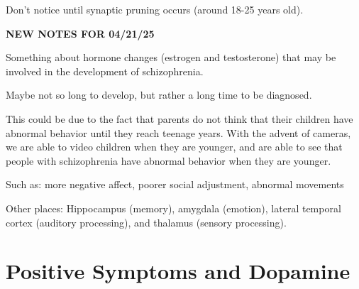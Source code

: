 \begin{coloredlist}
\begin{coloredlist}
\begin{coloredlist}
            \item Don't notice until synaptic pruning occurs (around 18-25 years old).
            \begin{center}
                \textbf{NEW NOTES FOR 04/21/25} \\
                \hrulefill
            \end{center}
            \item Something about hormone changes (estrogen and testosterone) that may be involved in the development of schizophrenia.
            \item Maybe not so long to develop, but rather a long time to be diagnosed.
            \begin{coloredlist}
                \item This could be due to the fact that parents do not think that their children have abnormal behavior until they reach teenage years. With the advent of cameras, we are able to video children when they are younger, and are able to see that people with schizophrenia have abnormal behavior when they are younger.
                \item Such as: more negative affect, poorer social adjustment, abnormal movements
            \end{coloredlist}
        \end{coloredlist}
    \end{coloredlist}
    \item Other places: Hippocampus (memory), amygdala (emotion), lateral temporal cortex (auditory processing), and thalamus (sensory processing).
\end{coloredlist}

\section{Positive Symptoms and Dopamine}

